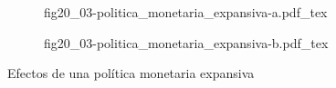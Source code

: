 \begin{figure}[h]
\captionsetup[subfigure]{aboveskip=20pt,belowskip=15pt}
\centering
\begin{subfigure}{.45\textwidth}
  \centering
        \def\svgwidth{\textwidth}
        {fig20_03-politica_monetaria_expansiva-a.pdf_tex}
\end{subfigure}\hspace{.05\textwidth}
\begin{subfigure}{.45\textwidth}
  \centering
        \def\svgwidth{\textwidth}
        {fig20_03-politica_monetaria_expansiva-b.pdf_tex}
\end{subfigure}
\caption{Efectos de una política monetaria expansiva}
\label{fig20_03-politica_monetaria_expansiva}
\end{figure}